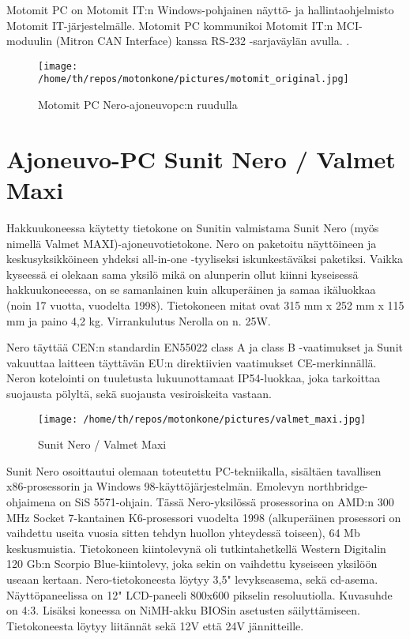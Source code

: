 \documentclass[11pt,a4paper,oneside,article]{memoir}
\begin{document}
Motomit PC on Motomit IT:n Windows-pohjainen näyttö- ja hallintaohjelmisto Motomit IT-järjestelmälle. Motomit PC kommunikoi Motomit IT:n MCI-moduulin (Mitron CAN Interface) kanssa RS-232 -sarjaväylän avulla.
 \cite{motomit:esite}.
\newline
\begin{figure}[H]
\centering
\texttt{[image: /home/th/repos/motonkone/pictures/motomit\_original.jpg]}
\caption{Motomit PC Nero-ajoneuvopc:n ruudulla}
\end{figure}

\section{Ajoneuvo-PC Sunit Nero / Valmet Maxi}

Hakkuukoneessa käytetty tietokone on Sunitin valmistama Sunit Nero (myös nimellä Valmet MAXI)-ajoneuvotietokone. Nero on paketoitu näyttöineen ja keskusyksikköineen yhdeksi all-in-one -tyyliseksi iskunkestäväksi paketiksi. Vaikka kyseessä ei olekaan sama yksilö mikä on alunperin ollut kiinni kyseisessä hakkuukoneeessa, on se samanlainen kuin alkuperäinen ja samaa ikäluokkaa (noin 17 vuotta, vuodelta 1998). Tietokoneen mitat ovat 315 mm x 252 mm x 115 mm ja paino 4,2 kg. Virrankulutus Nerolla on n. 25W.

Nero täyttää CEN:n standardin EN55022 class A ja class B -vaatimukset ja Sunit vakuuttaa laitteen täyttävän EU:n direktiivien vaatimukset CE-merkinnällä. Neron kotelointi on tuuletusta lukuunottamaat IP54-luokkaa, joka tarkoittaa suojausta pölyltä, sekä suojausta vesiroiskeita vastaan. \cite{nero:manual}

\begin{figure}[H]
\centering
\texttt{[image: /home/th/repos/motonkone/pictures/valmet\_maxi.jpg]}
\caption{Sunit Nero / Valmet Maxi}
\end{figure}

Sunit Nero osoittautui olemaan toteutettu PC-tekniikalla, sisältäen tavallisen x86-prosessorin ja Windows 98-käyttöjärjestelmän. Emolevyn northbridge-ohjaimena on SiS 5571-ohjain. Tässä Nero-yksilössä prosessorina on AMD:n 300 MHz Socket 7-kantainen K6-prosessori vuodelta 1998 (alkuperäinen prosessori on vaihdettu useita vuosia sitten tehdyn huollon yhteydessä toiseen), 64 Mb keskusmuistia. Tietokoneen kiintolevynä oli tutkintahetkellä Western Digitalin 120 Gb:n Scorpio Blue-kiintolevy, joka sekin on vaihdettu kyseiseen yksilöön useaan kertaan. Nero-tietokoneesta löytyy 3,5" levykseasema, sekä cd-asema. Näyttöpaneelissa on 12" LCD-paneeli 800x600 pikselin resoluutiolla. Kuvasuhde on 4:3. Lisäksi koneessa on NiMH-akku BIOSin asetusten säilyttämiseen. Tietokoneesta löytyy liitännät sekä 12V että 24V jännitteille.
\newline\newline
\end{document}
